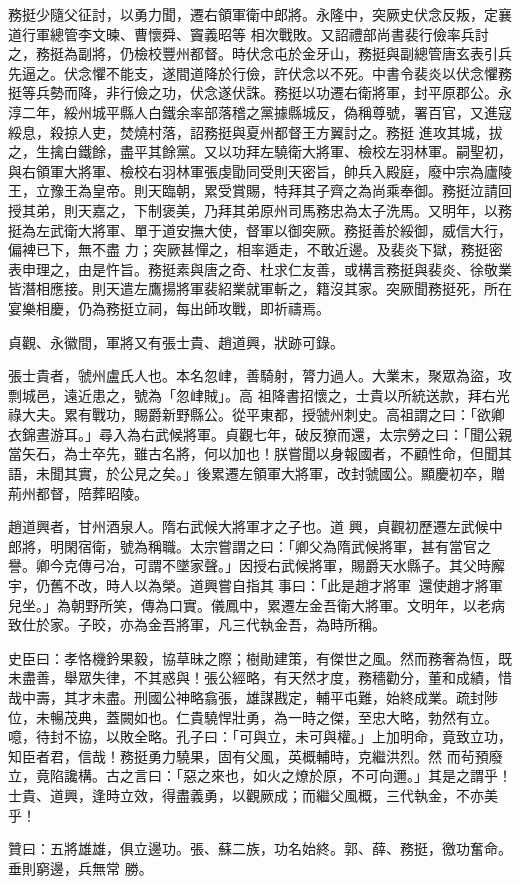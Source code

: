 \begin{pinyinscope}
 務挺少隨父征討，以勇力聞，遷右領軍衛中郎將。永隆中，突厥史伏念反叛，定襄道行軍總管李文暕、曹懷舜、竇義昭等
 相次戰敗。又詔禮部尚書裴行儉率兵討之，務挺為副將，仍檢校豐州都督。時伏念屯於金牙山，務挺與副總管唐玄表引兵先逼之。伏念懼不能支，遂間道降於行儉，許伏念以不死。中書令裴炎以伏念懼務挺等兵勢而降，非行儉之功，伏念遂伏誅。務挺以功遷右衛將軍，封平原郡公。永淳二年，綏州城平縣人白鐵余率部落稽之黨據縣城反，偽稱尊號，署百官，又進寇綏息，殺掠人吏，焚燒村落，詔務挺與夏州都督王方翼討之。務挺
 進攻其城，拔之，生擒白鐵餘，盡平其餘黨。又以功拜左驍衛大將軍、檢校左羽林軍。嗣聖初，與右領軍大將軍、檢校右羽林軍張虔勖同受則天密旨，帥兵入殿庭，廢中宗為廬陵王，立豫王為皇帝。則天臨朝，累受賞賜，特拜其子齊之為尚乘奉御。務挺泣請回授其弟，則天嘉之，下制褒美，乃拜其弟原州司馬務忠為太子洗馬。又明年，以務挺為左武衛大將軍、單于道安撫大使，督軍以御突厥。務挺善於綏御，威信大行，偏裨已下，無不盡
 力；突厥甚憚之，相率遁走，不敢近邊。及裴炎下獄，務挺密表申理之，由是忤旨。務挺素與唐之奇、杜求仁友善，或構言務挺與裴炎、徐敬業皆潛相應接。則天遣左鷹揚將軍裴紹業就軍斬之，籍沒其家。突厥聞務挺死，所在宴樂相慶，仍為務挺立祠，每出師攻戰，即祈禱焉。



 貞觀、永徽間，軍將又有張士貴、趙道興，狀跡可錄。



 張士貴者，虢州盧氏人也。本名忽峍，善騎射，膂力過人。大業末，聚眾為盜，攻剽城邑，遠近患之，號為「忽峍賊」。高
 祖降書招懷之，士貴以所統送款，拜右光祿大夫。累有戰功，賜爵新野縣公。從平東都，授虢州刺史。高祖謂之曰：「欲卿衣錦晝游耳。」尋入為右武候將軍。貞觀七年，破反獠而還，太宗勞之曰：「聞公親當矢石，為士卒先，雖古名將，何以加也！朕嘗聞以身報國者，不顧性命，但聞其語，未聞其實，於公見之矣。」後累遷左領軍大將軍，改封虢國公。顯慶初卒，贈荊州都督，陪葬昭陵。



 趙道興者，甘州酒泉人。隋右武候大將軍才之子也。道
 興，貞觀初歷遷左武候中郎將，明閑宿衛，號為稱職。太宗嘗謂之曰：「卿父為隋武候將軍，甚有當官之譽。卿今克傳弓冶，可謂不墜家聲。」因授右武候將軍，賜爵天水縣子。其父時廨宇，仍舊不改，時人以為榮。道興嘗自指其事曰：「此是趙才將軍，還使趙才將軍兒坐。」為朝野所笑，傳為口實。儀鳳中，累遷左金吾衛大將軍。文明年，以老病致仕於家。子晈，亦為金吾將軍，凡三代執金吾，為時所稱。



 史臣曰：孝恪機鈐果毅，協草昧之際；樹勛建策，有傑世之風。然而務奢為恆，既未盡善，舉眾失律，不其惑與！張公經略，有天然才度，務穡勸分，董和成績，惜哉中壽，其才未盡。刑國公神略翕張，雄謀戡定，輔平屯難，始終成業。疏封陟位，未暢茂典，蓋闕如也。仁貴驍悍壯勇，為一時之傑，至忠大略，勃然有立。噫，待封不協，以敗全略。孔子曰：「可與立，未可與權。」上加明命，竟致立功，知臣者君，信哉！務挺勇力驍果，固有父風，英概輔時，克繼洪烈。然
 而茍預廢立，竟陷讒構。古之言曰：「惡之來也，如火之燎於原，不可向邇。」其是之謂乎！士貴、道興，逢時立效，得盡義勇，以觀厥成；而繼父風概，三代執金，不亦美乎！



 贊曰：五將雄雄，俱立邊功。張、蘇二族，功名始終。郭、薛、務挺，徼功奮命。垂則窮邊，兵無常
 勝。



\end{pinyinscope}